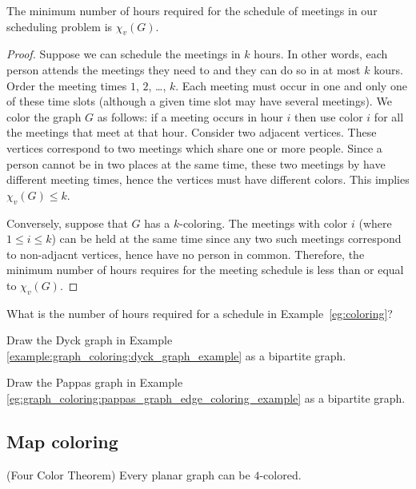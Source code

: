\begin{theorem}
The minimum number of hours required for the schedule of meetings in
our scheduling problem is $\chi_v(G)$.
\end{theorem}

\begin{proof}

Suppose we can schedule the meetings in $k$ hours. In other words,
each person attends the meetings they need to and they
can do so in at most $k$ kours. Order the meeting
times $1$, $2$, \dots, $k$. Each meeting must occur in one and only
one of these time slots (although a given time slot may have
several meetings). We color the graph $G$ as follows:
if a meeting occurs in hour $i$ then use color $i$ for all the
meetings that meet at that hour. Consider two adjacent
vertices. These vertices correspond to two meetings which
share one or more people. Since a person cannot be in two places at
the same time, these two meetings by have different meeting times,
hence the vertices must have different colors. This implies
$\chi_v(G)\leq k$.

Conversely, suppose that $G$ has a $k$-coloring.
The meetings with color $i$ (where $1\leq i\leq k$)
can be held at the same time since any two such meetings
correspond to non-adjacnt vertices, hence have no
person in common. Therefore, the minimum number of
hours requires for the meeting schedule is less than
or equal to $\chi_v(G)$.

\end{proof}

\begin{problem}
\item
What is the number of hours required for a schedule
in Example~\ref{eg:coloring}?
\item
Draw the Dyck graph in Example \ref{example:graph_coloring:dyck_graph_example}
as a bipartite graph.

\item
Draw the Pappas graph in Example
\ref{eg:graph_coloring:pappas_graph_edge_coloring_example}
as a bipartite graph.
\end{problem}

\subsection{Map coloring}


\begin{theorem}
(Four Color Theorem)
Every planar graph can be $4$-colored.
\end{theorem}
